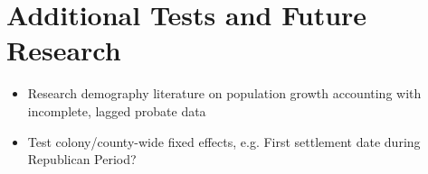 \documentclass[11pt, oneside]{article}
\begin{document}
\section{Additional Tests and Future Research}

\begin{itemize}
\item{Research demography literature on population growth accounting with incomplete, lagged probate data}
\item{Test colony/county-wide fixed effects, e.g. First settlement date during Republican Period?}


\end{itemize}
\end{document}
